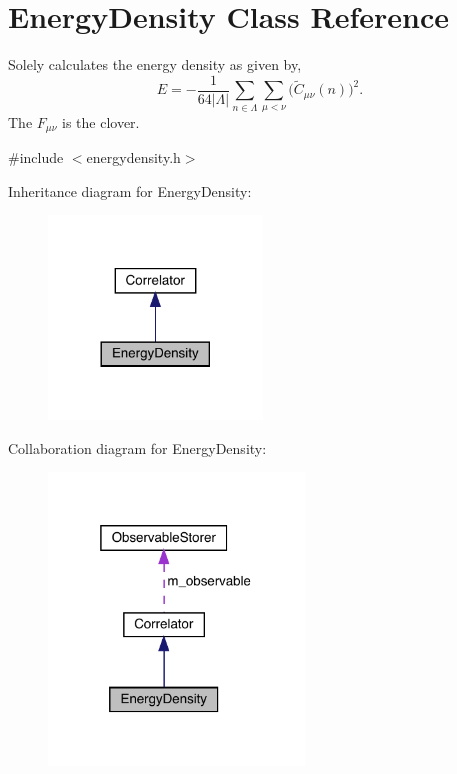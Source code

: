 \hypertarget{class_energy_density}{}\section{Energy\+Density Class Reference}
\label{class_energy_density}


Solely calculates the energy density as given by, \[ E = -\frac{1}{64|\Lambda|} \sum_{n\in\Lambda}\sum_{\mu<\nu} \big(\tilde{C}_{\mu\nu}(n)\big)^2. \] The $F_{\mu\nu}$ is the clover.  




{\ttfamily \#include $<$energydensity.\+h$>$}



Inheritance diagram for Energy\+Density\+:\nopagebreak
\begin{figure}[H]
\begin{center}
\leavevmode
\includegraphics[width=161pt]{class_energy_density__inherit__graph}
\end{center}
\end{figure}


Collaboration diagram for Energy\+Density\+:\nopagebreak
\begin{figure}[H]
\begin{center}
\leavevmode
\includegraphics[width=193pt]{class_energy_density__coll__graph}
\end{center}
\end{figure}
